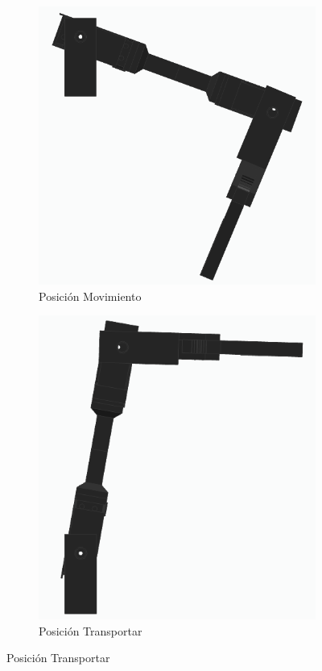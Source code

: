 \begin{figure}[H]
    \centering
    \begin{subfigure}[b]{0.35\textwidth}
        \centering
        \includegraphics[width=\textwidth]{imagenes/brazo_movimiento.png}
        \caption{Posición Movimiento}
    \end{subfigure}
    \hfill
    \begin{subfigure}[b]{0.35\textwidth}
        \centering
        \includegraphics[width=\textwidth]{imagenes/brazo_transportar.png}
        \caption{Posición Transportar}
    \end{subfigure}


\end{figure}
